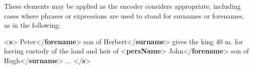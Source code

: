 These elements may be applied as the encoder considers appropriate, including cases where phrases or expressions are used to stand for surnames or forenames, as in the following: \par\bgroup{}\exampleFont \begin{shaded}\noindent\mbox{}{<\textbf{s}>}\mbox{}\newline 
{}\mbox{}\newline 
\hspace*{1em}Peter{</\textbf{forename}>}\mbox{}\newline 
\hspace*{1em}son of Herbert{</\textbf{surname}>}\mbox{}\newline 
{} gives the king 40 m. for having custody of the land and heir of\mbox{}\newline 
{<\textbf{persName}>}\mbox{}\newline 
\hspace*{1em}John{</\textbf{forename}>}\mbox{}\newline 
\hspace*{1em}son of Hugh{</\textbf{surname}>}\mbox{}\newline 
{}...\mbox{}\newline 
{</\textbf{s}>}\end{shaded}\egroup\par \par

